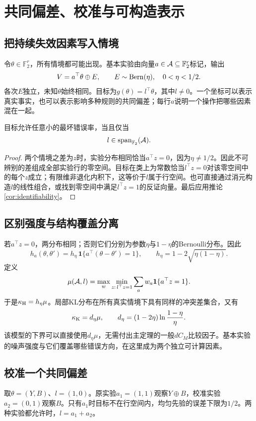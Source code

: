 \chapter{共同偏差、校准与可构造表示}
\label{ch:calibration}

\section{把持续失效因素写入情境}
令$\theta\in\mathbb F_2^r$，所有情境都可能出现。基本实验由向量$a\in\mathcal A\subseteq\mathbb F_2^r$标记，输出
\[
 V=a^\top\theta\oplus E,\qquad E\sim\operatorname{Bern}(\eta),\quad0<\eta<1/2.
\]
各次$E$独立，未知$\theta$始终相同。目标为$g(\theta)=l^\top\theta$，其中$l\ne0$。一个坐标可以表示真实事实，也可以表示影响多种规则的共同偏差；每行$a$说明一个操作把哪些因素混在一起。

\begin{theorem}[线性目标的可辨别性]
\label{thm:span}
目标允许任意小的最坏错误率，当且仅当
\[
 l\in\operatorname{span}_{\mathbb F_2}(\mathcal A).
\]
\end{theorem}
\begin{proof}
两个情境之差为$z$时，实验分布相同恰当$a^\top z=0$，因为$\eta\ne1/2$。因此不可辨别的差组成全部实验行的零空间。目标在类上为常数恰当$l^\top z=0$对该零空间中的每个$z$成立；有限维非退化内积下，这等价于$l$属于行空间。也可直接通过消元构造$l$的线性组合，或找到零空间中满足$l^\top z=1$的反证向量。最后应用推论\ref{cor:identifiability}。
\end{proof}

\section{区别强度与结构覆盖分离}
若$a^\top z=0$，两分布相同；否则它们分别为参数$\eta$与$1-\eta$的Bernoulli分布。因此
\[
 h_a(\theta,\theta')=h_\eta\,\mathbf1\{a^\top(\theta-\theta')=1\},
 \qquad h_\eta=1-2\sqrt{\eta(1-\eta)}.
\]
定义
\[
 \mu(\mathcal A,l)=\max_w\min_{z:\,l^\top z=1}
               \sum_aw_a\mathbf1\{a^\top z=1\}.
\]
于是$\kappa_{\mathrm H}=h_\eta\mu$。局部KL分布在所有真实情境下具有同样的冲突差集合，又有
\[
 \kappa_{\mathrm K}=d_\eta\mu,\qquad
 d_\eta=(1-2\eta)\ln\frac{1-\eta}{\eta}.
\]
该模型的下界可以直接使用$d_\eta\mu$，无需付出主定理的一般$dC_M$比较因子。基本实验的噪声强度与它们覆盖哪些错误方向，在这里成为两个独立可计算因素。

\section{校准一个共同偏差}
取$\theta=(Y,B)$、$l=(1,0)$。原实验$a_1=(1,1)$观察$Y\oplus B$，校准实验$a_2=(0,1)$观察$B$。只有$a_1$时目标不在行空间内，均匀先验的误差下限为$1/2$。两种实验都允许时，$l=a_1+a_2$。

